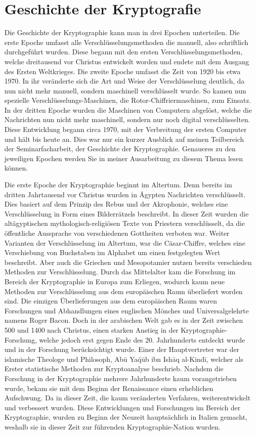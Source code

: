 \chapter{Geschichte der Kryptografie}
Die Geschichte der Kryptographie kann man in drei Epochen unterteilen.
Die erste Epoche umfasst alle Verschlüsselungsmethoden die manuell, also schriftlich durchgeführt wurden.
Diese begann mit den ersten Verschlüsselungsmethoden, welche dreitausend vor Christus entwickelt worden und endete mit dem Ausgang des Ersten Weltkrieges. 
Die zweite Epoche umfasst die Zeit von 1920 bis etwa 1970. 
In ihr veränderte sich die Art und Weise der Verschlüsselung deutlich, da nun nicht mehr manuell, sondern maschinell verschlüsselt wurde. 
So kamen nun spezielle Verschlüsselungs-Maschinen, die Rotor-Chiffriermaschinen, zum Einsatz. 
In der dritten Epoche wurden die Maschinen von Computern abgelöst, welche die Nachrichten nun nicht mehr maschinell, sondern nur noch digital verschlüsselten. 
Diese Entwicklung begann circa 1970, mit der Verbreitung der ersten Computer und hält bis heute an. 
Dies war nur ein kurzer Ausblick auf meinen Teilbereich der Seminarfacharbeit, der Geschichte der Kryptographie. 
Genaueres zu den jeweiligen Epochen werden Sie in meiner Ausarbeitung zu diesem Thema lesen können. 

Die erste Epoche der Kryptographie beginnt im Altertum. Denn bereits im dritten Jahrtausend vor Christus wurden in Ägypten Nachrichten verschlüsselt. Dies basiert auf dem Prinzip des Rebus und der Akrophonie, welches eine Verschlüsselung in Form eines Bilderrätzels beschreibt. In dieser Zeit wurden die altägyptischen mythologisch-religiösen Texte von Priestern verschlüsselt, da die öffentliche Aussprache von verschiedenen Gottheiten verboten war. Weiter Varianten der Verschlüsselung im Altertum, war die Cäsar-Chiffre, welches eine Verschiebung von Buchstaben im Alphabet um einen festgelegten Wert beschreibt. Aber auch die Griechen und Mesopotamier nutzen bereits verschieden Methoden zur Verschlüsselung. Durch das Mittelalter kam die Forschung im Bereich der Kryptographie in Europa zum Erliegen, wodurch kaum neue Methoden zur Verschlüsselung aus dem europäischen Raum überliefert worden sind. Die einzigen Überlieferungen aus dem europäischen Raum waren Forschungen und Abhandlungen eines englischen Mönches und Universalgelehrte namens Roger Bacon. Doch in der arabischen Welt gab es in der Zeit zwischen 500 und 1400 nach Christus, einen starken Anstieg in der Kryptographie-Forschung, welche jedoch erst gegen Ende des 20. Jahrhunderts entdeckt wurde und in der Forschung berücksichtigt wurde. Einer der Hauptvertreter war der islamische Theologe und Philosoph, Abū Ya\'qūb ibn Ishāq al-Kindī, welcher als Erster statistische Methoden zur Kryptoanalyse beschrieb. Nachdem die Forschung in der Kryptographie mehrere Jahrhunderte kaum vorangetrieben wurde, bekam sie mit dem Beginn der Renaissance einen erheblichen Aufschwung. Da in dieser Zeit, die kaum veränderten Verfahren, weiterentwickelt und verbessert wurden. Diese Entwicklungen und Forschungen im Bereich der Kryptographie, wurden zu Beginn der Neuzeit hauptsächlich in Italien gemacht, weshalb sie in dieser Zeit zur führenden Kryptographie-Nation wurden. 

